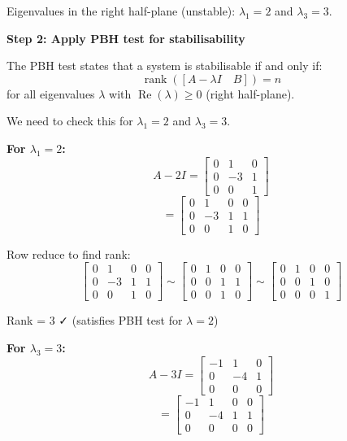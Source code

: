 \documentclass[11pt,a4paper]{article}
\begin{document}
Eigenvalues in the right half-plane (unstable): $\lambda_1 = 2$ and $\lambda_3 = 3$.

\textbf{Step 2: Apply PBH test for stabilisability}

The PBH test states that a system is stabilisable if and only if:
\begin{equation}
\operatorname{rank}([A - \lambda I \quad B]) = n
\end{equation}
for all eigenvalues $\lambda$ with $\operatorname{Re}(\lambda) \geq 0$ (right half-plane).

We need to check this for $\lambda_1 = 2$ and $\lambda_3 = 3$.

\textbf{For $\lambda_1 = 2$:}
\begin{equation}
A - 2I = \begin{bmatrix} 0 & 1 & 0 \\ 0 & -3 & 1 \\ 0 & 0 & 1 \end{bmatrix}
\end{equation}
\begin{equation}
[A - 2I \quad B] = \begin{bmatrix} 0 & 1 & 0 & 0 \\ 0 & -3 & 1 & 1 \\ 0 & 0 & 1 & 0 \end{bmatrix}
\end{equation}

Row reduce to find rank:
\begin{equation}
\begin{bmatrix} 0 & 1 & 0 & 0 \\ 0 & -3 & 1 & 1 \\ 0 & 0 & 1 & 0 \end{bmatrix} \sim \begin{bmatrix} 0 & 1 & 0 & 0 \\ 0 & 0 & 1 & 1 \\ 0 & 0 & 1 & 0 \end{bmatrix} \sim \begin{bmatrix} 0 & 1 & 0 & 0 \\ 0 & 0 & 1 & 0 \\ 0 & 0 & 0 & 1 \end{bmatrix}
\end{equation}

Rank = 3 ✓ (satisfies PBH test for $\lambda = 2$)

\textbf{For $\lambda_3 = 3$:}
\begin{equation}
A - 3I = \begin{bmatrix} -1 & 1 & 0 \\ 0 & -4 & 1 \\ 0 & 0 & 0 \end{bmatrix}
\end{equation}
\begin{equation}
[A - 3I \quad B] = \begin{bmatrix} -1 & 1 & 0 & 0 \\ 0 & -4 & 1 & 1 \\ 0 & 0 & 0 & 0 \end{bmatrix}
\end{equation}
\end{document}
